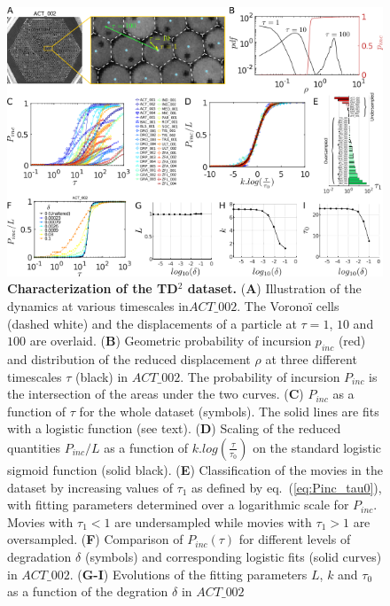     \begin{figure}[h!]
    \centering
    \includegraphics[width=1\textwidth]{part_1/assets/Figure_3.png}
    \caption{{\bf Characterization of the TD$^2$ dataset.}
        (\textbf{A}) Illustration of the dynamics at various timescales in$ACT\_002$. The Voronoï cells (dashed white) and the displacements of a particle at $\tau=1$, $10$ and $100$ are overlaid.
        (\textbf{B}) Geometric probability of incursion $p_{inc}$ (red) and distribution of the reduced displacement $\rho$ at three different timescales $\tau$ (black) in $ACT\_002$. The probability of incursion $P_{inc}$ is the intersection of the areas under the two curves.
        (\textbf{C}) $P_{inc}$ as a function of $\tau$ for the whole dataset (symbols). The solid lines are fits with a logistic function (see text).
        (\textbf{D}) Scaling of the reduced quantities $P_{inc}/L$ as a function of $k.log(\frac{\tau}
        {\tau_0})$ on the standard logistic sigmoid function (solid black).
        (\textbf{E}) Classification of the movies in the dataset by increasing values of $\tau_1$ as defined by eq.~(\ref{eq:Pinc_tau0}), with fitting parameters determined over a logarithmic scale for $P_{inc}$. Movies with $\tau_1<1$ are undersampled while movies with $\tau_1>1$ are oversampled.
        (\textbf{F}) Comparison of $P_{inc}(\tau)$ for different levels of degradation $\delta$ (symbols) and corresponding logistic fits (solid curves) in $ACT\_002$.
        (\textbf{G-I}) Evolutions of the fitting parameters $L$, $k$ and $\tau_0$ as a function of the degration $\delta$ in $ACT\_002$}
    \label{part_1:fig_3}
    \end{figure}

